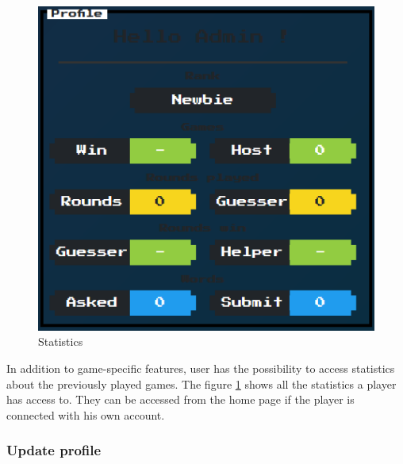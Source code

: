 \documentclass{tnreport}
\begin{document}
\begin{figure}
	\centering
	\vspace*{-2cm}
	\includegraphics[scale=0.5]{figures/statistics}
	\caption{Statistics}
	\label{fig:statistics}
	\vspace*{-2cm}
\end{figure}

In addition to game-specific features, user has the possibility to access statistics about the previously played games. The figure \ref{fig:statistics} shows all the statistics a player has access to. They can be accessed from the home page if the player is connected with his own account. 

\bigskip
\bigskip
\bigskip

\subsubsection{Update profile}
\end{document}
